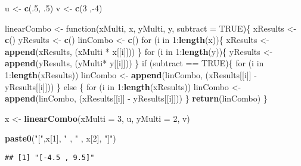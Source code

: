 \documentclass[]{article}
\newenvironment{Shaded}{\begin{snugshade}}{\end{snugshade}}
\newcommand{\KeywordTok}[1]{\textcolor[rgb]{0.13,0.29,0.53}{\textbf{{#1}}}}
\newcommand{\DataTypeTok}[1]{\textcolor[rgb]{0.13,0.29,0.53}{{#1}}}
\newcommand{\DecValTok}[1]{\textcolor[rgb]{0.00,0.00,0.81}{{#1}}}
\newcommand{\StringTok}[1]{\textcolor[rgb]{0.31,0.60,0.02}{{#1}}}
\newcommand{\OtherTok}[1]{\textcolor[rgb]{0.56,0.35,0.01}{{#1}}}
\newcommand{\NormalTok}[1]{{#1}}
\begin{document}
\begin{Shaded}
\begin{Highlighting}[]
\NormalTok{u <-}\StringTok{  }\KeywordTok{c}\NormalTok{(.}\DecValTok{5}\NormalTok{, .}\DecValTok{5}\NormalTok{)}
\NormalTok{v <-}\StringTok{  }\KeywordTok{c}\NormalTok{(}\DecValTok{3} \NormalTok{,-}\DecValTok{4}\NormalTok{)}

\NormalTok{linearCombo <-}\StringTok{ }\NormalTok{function(xMulti, x, yMulti, y, }\DataTypeTok{subtract =} \OtherTok{TRUE}\NormalTok{)\{}
      \NormalTok{xResults  <-}\StringTok{ }\KeywordTok{c}\NormalTok{()}
      \NormalTok{yResults  <-}\StringTok{ }\KeywordTok{c}\NormalTok{()}
      \NormalTok{linCombo <-}\StringTok{ }\KeywordTok{c}\NormalTok{()}
    \NormalTok{for (i in }\DecValTok{1}\NormalTok{:}\KeywordTok{length}\NormalTok{(x))\{  }
      \NormalTok{xResults <-}\StringTok{ }\KeywordTok{append}\NormalTok{(xResults, (xMulti *}\StringTok{ }\NormalTok{x[[i]]))}
    \NormalTok{\}}
    \NormalTok{for (i in }\DecValTok{1}\NormalTok{:}\KeywordTok{length}\NormalTok{(y))\{ }
      \NormalTok{yResults <-}\StringTok{ }\KeywordTok{append}\NormalTok{(yResults, (yMulti*}\StringTok{ }\NormalTok{y[[i]]))}
    \NormalTok{\}}
    \NormalTok{if (subtract ==}\StringTok{ }\OtherTok{TRUE}\NormalTok{)\{ }
    \NormalTok{for (i in }\DecValTok{1}\NormalTok{:}\KeywordTok{length}\NormalTok{(xResults))}
      \NormalTok{linCombo <-}\StringTok{ }\KeywordTok{append}\NormalTok{(linCombo, (xResults[[i]] -}\StringTok{ }\NormalTok{yResults[[i]]))}
    \NormalTok{\} else \{}
    \NormalTok{for (i in }\DecValTok{1}\NormalTok{:}\KeywordTok{length}\NormalTok{(xResults))}
      \NormalTok{linCombo <-}\StringTok{ }\KeywordTok{append}\NormalTok{(linCombo, (xResults[[i]] -}\StringTok{ }\NormalTok{yResults[[i]]))}
    \NormalTok{\}}
    \KeywordTok{return}\NormalTok{(linCombo)}
\NormalTok{\}}

\NormalTok{x <-}\StringTok{ }\KeywordTok{linearCombo}\NormalTok{(}\DataTypeTok{xMulti =} \DecValTok{3}\NormalTok{, u, }\DataTypeTok{yMulti =} \DecValTok{2}\NormalTok{, v)}

\KeywordTok{paste0}\NormalTok{(}\StringTok{"["}\NormalTok{,x[}\DecValTok{1}\NormalTok{], }\StringTok{" , "} \NormalTok{, x[}\DecValTok{2}\NormalTok{], }\StringTok{"]"}\NormalTok{)}
\end{Highlighting}
\end{Shaded}

\begin{verbatim}
## [1] "[-4.5 , 9.5]"
\end{verbatim}
\end{document}

